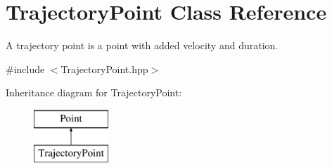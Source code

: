 \hypertarget{classTrajectoryPoint}{\section{Trajectory\-Point Class Reference}
\label{classTrajectoryPoint}
}


A trajectory point is a point with added velocity and duration.  




{\ttfamily \#include $<$Trajectory\-Point.\-hpp$>$}

Inheritance diagram for Trajectory\-Point\-:\begin{figure}[H]
\begin{center}
\leavevmode
\includegraphics[height=2.000000cm]{classTrajectoryPoint}
\end{center}
\end{figure}
